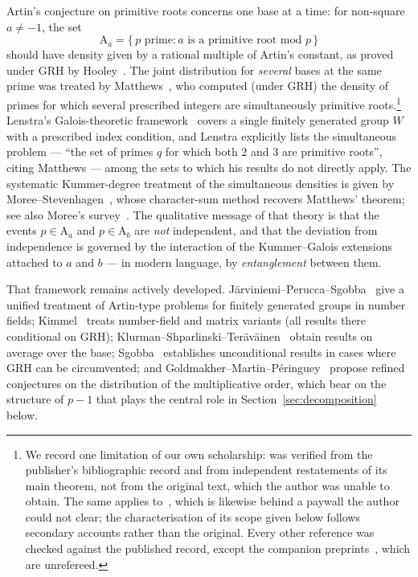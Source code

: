 \documentclass[11pt,reqno]{amsart}
\theoremstyle{plain}
\theoremstyle{definition}
\newcommand{\Art}{\mathrm{A}}
\begin{document}
Artin's conjecture on primitive roots concerns one base at a time: for
non-square $a \neq -1$, the set
\[
  \Art_a = \{\, p \text{ prime} : a \text{ is a primitive root mod } p \,\}
\]
should have density given by a rational multiple of Artin's constant, as
proved under GRH by Hooley~\cite{Hooley1967}. The joint distribution for
\emph{several} bases at the same prime was treated by
Matthews~\cite{Matthews1976}, who computed (under GRH) the density of primes
for which several prescribed integers are simultaneously primitive
roots.\footnote{We record one limitation of our own scholarship:
\cite{Matthews1976} was verified from the publisher's bibliographic record and
from independent restatements of its main theorem, not from the original text,
which the author was unable to obtain. The same applies to~\cite{Lenstra1977},
which is likewise behind a paywall the author could not clear; the
characterisation of its scope given below follows secondary accounts rather
than the original. Every other reference was checked
against the published record, except the companion
preprints~\cite{BaldI, BaldII}, which are unrefereed.}
Lenstra's Galois-theoretic framework~\cite{Lenstra1977} covers a single
finitely generated group $W$ with a prescribed index condition, and Lenstra explicitly lists the simultaneous problem --- ``the set of primes $q$ for which
both $2$ and $3$ are primitive roots'', citing Matthews --- among
the sets to which his results do not directly apply. The systematic Kummer-degree treatment of the simultaneous densities is given by Moree--Stevenhagen~\cite{MoreeStevenhagen2014}, whose character-sum method
recovers Matthews' theorem; see also Moree's survey~\cite{Moree2012}. The qualitative message of
that theory is that the events $p \in \Art_a$ and $p \in \Art_b$ are
\emph{not} independent, and that the deviation from independence is governed
by the interaction of the Kummer--Galois extensions attached to $a$ and $b$
--- in modern language, by \emph{entanglement} between them.

That framework remains actively developed.
J\"arviniemi--Perucca--Sgobba~\cite{JarviniemiPeruccaSgobba2025} give a unified
treatment of Artin-type problems for finitely generated groups in number
fields; Kimmel~\cite{Kimmel2024} treats number-field and matrix variants (all results there conditional on GRH);
Klurman--Shparlinski--Ter\"av\"ainen~\cite{KlurmanShparlinskiTeravainen2025}
obtain results on average over the base; Sgobba~\cite{Sgobba2025} establishes
unconditional results in cases where GRH can be circumvented; and
Goldmakher--Martin--P\'eringuey~\cite{GoldmakherMartinPeringuey2025} propose
refined conjectures on the distribution of the multiplicative order, which
bear on the structure of $p-1$ that plays the central role in
Section~\ref{sec:decomposition} below.
\end{document}
